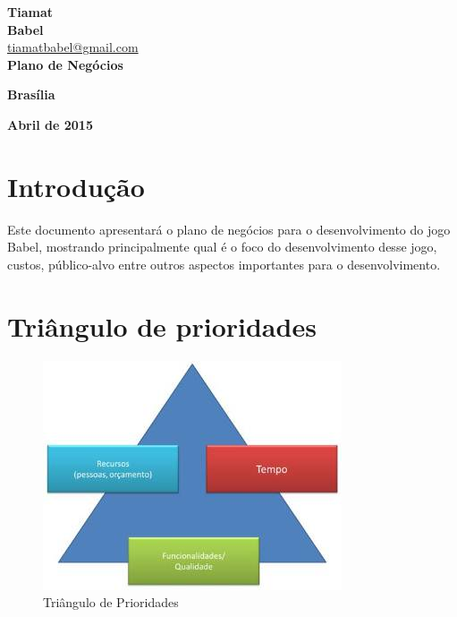 \documentclass[11pt]{article} %
\begin{document}
\begin{titlepage}
 \vfill
  \begin{center}
   {\large \textbf{Tiamat}} \\
   {\large \textbf{Babel}}\\
   {\large \url{tiamatbabel@gmail.com}}\\[6cm]


   {\Large \textbf{Plano de Negócios}}\\

   \hspace{.45\textwidth} %
  \vfill

\vspace{2cm}

\large \textbf{Brasília}

\large \textbf{Abril de 2015}
\end{center}
\end{titlepage}
\newpage

\tableofcontents

\newpage


\section{Introdução}

Este documento apresentará o plano de negócios para o desenvolvimento do jogo Babel, mostrando principalmente qual é o foco do desenvolvimento desse jogo, custos, público-alvo entre outros aspectos importantes para o desenvolvimento.

\section{Triângulo de prioridades}

\begin{figure}[!htp]
\centering
\includegraphics[scale=0.75]{pictures/restrictions_triangle.jpg}
\caption{Triângulo de Prioridades}
\label{Prioridades}
\end{figure}
\end{document}
